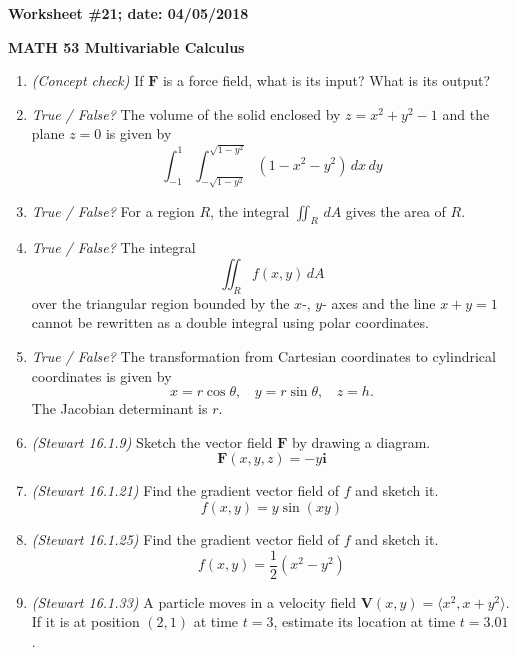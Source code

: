 \documentclass{article}
\newcommand{\ii}{\mathbf{i}}
\begin{document}
{\bf Worksheet \#21; date: 04/05/2018}

{\bf MATH 53 Multivariable Calculus}

\begin{enumerate}
\item {\em (Concept check)} If $\mathbf{F}$ is a force field, what is its input? What is its output?

\item {\em True / False?} The volume of the solid enclosed by $z = x^2 + y^2 - 1$ and the plane $z = 0$ is given by
\[
\int_{-1}^1 \int_{-\sqrt{1 - y^2}}^{\sqrt{1 - y^2}} (1 - x^2 - y^2) \,dx \,dy
\]

\item {\em True / False?} For a region $R$, the integral $\iint_R \,dA$ gives the area of $R$.

\item {\em True / False?} The integral
\[
\iint_R f(x, y) \,dA
\]
over the triangular region bounded by the $x$-, $y$- axes and the line $x + y = 1$ cannot be rewritten as a double integral using polar coordinates.

\item {\em True / False?} The transformation from Cartesian coordinates to cylindrical coordinates is given by
\[
x = r \cos \theta, ~~~~ y = r \sin \theta, ~~~~ z = h.
\]
The Jacobian determinant is $r$.

\item {\em (Stewart 16.1.9)} Sketch the vector field $\mathbf{F}$ by drawing a diagram.
\[
\mathbf{F}(x, y, z) = -y \ii
\]

\item {\em (Stewart 16.1.21)} Find the gradient vector field of $f$ and sketch it.
\[
f(x, y) = y \sin(xy)
\]

\item {\em (Stewart 16.1.25)} Find the gradient vector field of $f$ and sketch it.
\[
f(x, y) = \frac{1}{2} (x^2 - y^2)
\]

\item {\em (Stewart 16.1.33)} A particle moves in a velocity field $\mathbf{V}(x, y) = \langle x^2, x + y^2\rangle$. If it is at position $(2, 1)$ at time $t = 3$, estimate its location at time $t = 3.01$.
\end{enumerate}
\end{document}
